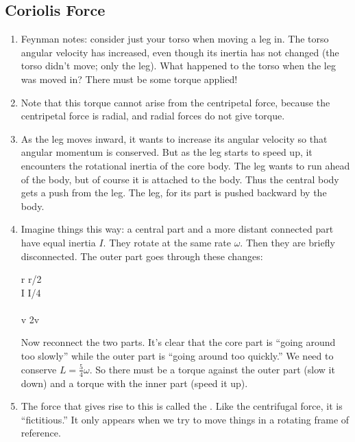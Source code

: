 \subsection{Coriolis Force}

\begin{enumerate}

  \item Feynman notes: consider just your torso when moving a leg in.
  The torso angular velocity has increased, even though its inertia has
  not changed (the torso didn't move; only the leg). What happened to
  the torso when the leg was moved in? There must be some torque
  applied!

  \item Note that this torque cannot arise from the centripetal force,
  because the centripetal force is radial, and radial forces do not give
  torque.

  \item As the leg moves inward, it wants to increase its angular
  velocity so that angular momentum is conserved. But as the leg starts
  to speed up, it encounters the rotational inertia of the core body.
  The leg wants to run ahead of the body, but of course it is attached
  to the body. Thus the central body gets a push from the leg. The leg,
  for its part is pushed backward by the body.

  \item Imagine things this way: a central part and a more distant
  connected part have equal inertia $I$. They rotate at the same rate
  $\omega$. Then they are briefly disconnected. The outer part goes
  through these changes:

  \begin{nedqn}
    r \mapstocol r/2
  \\
    I \mapstocol I/4
  \\
    \omega {}\omega
  \\
    v \mapstocol 2v
  \end{nedqn}

  \noindent
  Now reconnect the two parts. It's clear that the core part is ``going
  around too slowly'' while the outer part is ``going around too
  quickly.'' We need to conserve $L = \frac{5}{4} \omega$. So there must
  be a torque against the outer part (slow it down) and a torque with
  the inner part (speed it up).

  \item The force that gives rise to this is called the . Like the centrifugal force, it is ``fictitious.'' It only
  appears when we try to move things in a rotating frame of reference.


\end{enumerate}
